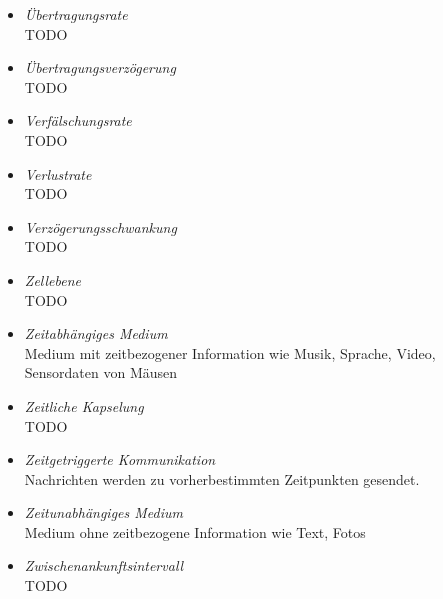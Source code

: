 \documentclass{article}
\begin{document}
\begin{itemize}
	\item \emph{Übertragungsrate}\\
		TODO

	\item \emph{Übertragungsverzögerung}\\
		TODO

	\item \emph{Verfälschungsrate}\\
		TODO

	\item \emph{Verlustrate}\\
		TODO

	\item \emph{Verzögerungsschwankung}\\
		TODO

	\item \emph{Zellebene}\\
		TODO

	\item \emph{Zeitabhängiges Medium}\\
		Medium mit zeitbezogener Information wie Musik, Sprache, Video, Sensordaten von Mäusen
	
	\item \emph{Zeitliche Kapselung}\\
		TODO

	\item \emph{Zeitgetriggerte Kommunikation}\\
		Nachrichten werden zu vorherbestimmten Zeitpunkten gesendet.

	\item \emph{Zeitunabhängiges Medium}\\
		Medium ohne zeitbezogene Information wie Text, Fotos

	\item \emph{Zwischenankunftsintervall}\\
		TODO
\end{itemize}
\end{document}
